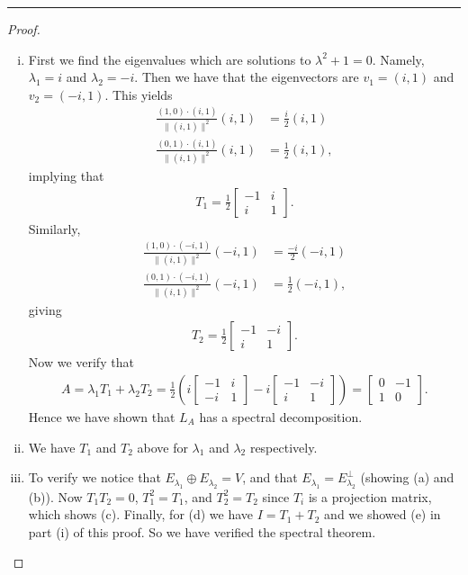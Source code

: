 \documentclass[leqno]{article}
\theoremstyle{nonumberplain}
\newtheorem{proof}{Proof}
\begin{document}
\noindent\rule[0.5ex]{\linewidth}{1pt}

\begin{proof}~
\begin{enumerate}[(i)]
\item First we find the eigenvalues which are solutions to $\lambda^2+1=0$.  Namely, $\lambda_1=i$ and $\lambda_2=-i$.  Then we have that the eigenvectors are $v_1 = (i,1)$ and $v_2 = (-i,1)$. This yields
\begin{align*}
\frac{(1,0)\cdot (i,1)}{\|(i,1)\|^2}(i,1)&=\frac{i}{2}(i,1)\\
\frac{(0,1)\cdot (i,1)}{\|(i,1)\|^2}(i,1)&=\frac{1}{2}(i,1),
\end{align*}
implying that
\begin{align*}
T_1=\frac{1}{2}\begin{bmatrix}
-1 & i\\
i & 1
\end{bmatrix}.
\end{align*}
Similarly,
\begin{align*}
\frac{(1,0)\cdot (-i,1)}{\|(i,1)\|^2}(-i,1)&=\frac{-i}{2}(-i,1)\\
\frac{(0,1)\cdot (-i,1)}{\|(i,1)\|^2}(-i,1)&=\frac{1}{2}(-i,1),
\end{align*}
giving
\begin{align*}
T_2=\frac{1}{2}\begin{bmatrix}
-1 & -i\\
i & 1
\end{bmatrix}.
\end{align*}
Now we verify that
\begin{align*}
A=\lambda_1 T_1 + \lambda_2 T_2 = \frac{1}{2}\left(i \begin{bmatrix}
-1 & i\\
-i & 1
\end{bmatrix} -i \begin{bmatrix}
-1 & -i\\
i & 1
\end{bmatrix}\right)=\begin{bmatrix}
0 & -1\\
1 & 0
\end{bmatrix}.
\end{align*}
Hence we have shown that $L_A$ has a spectral decomposition. 
\item We have $T_1$ and $T_2$ above for $\lambda_1$ and $\lambda_2$ respectively.

\item To verify we notice that $E_{\lambda_1}\oplus E_{\lambda_2}=V$, and that $E_{\lambda_1}=E_{\lambda_2}^\perp$ (showing (a) and (b)).  Now $T_1 T_2= 0$, $T_1^2=T_1$, and $T_2^2=T_2$ since $T_i$ is a projection matrix, which shows (c).  Finally, for (d) we have $I=T_1 + T_2$ and we showed (e) in part (i) of this proof.  So we have verified the spectral theorem.

\end{enumerate}
\end{proof}
\end{document}
